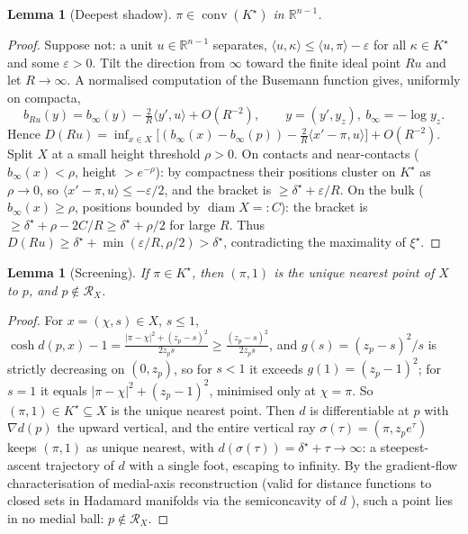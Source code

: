\documentclass[11pt]{article}
\newtheorem{lemma}[theorem]{Lemma}
\theoremstyle{remark}
\newcommand{\R}{\mathbb{R}}
\newcommand{\X}{X}
\newcommand{\Rx}{\mathcal{R}_{\X}}
\begin{document}
\begin{lemma}[Deepest shadow]\label{lem:deepshadow}
$\pi\in\operatorname{conv}(K^{\star})$ in $\R^{n-1}$.
\end{lemma}

\begin{proof}
Suppose not: a unit $u\in\R^{n-1}$ separates,
$\langle u,\kappa\rangle\le\langle u,\pi\rangle-\varepsilon$ for all
$\kappa\in K^{\star}$ and some $\varepsilon>0$. Tilt the direction
from $\infty$ toward the finite ideal point $Ru$ and let $R\to\infty$.
A normalised computation of the Busemann function gives, uniformly on
compacta,
\[
b_{Ru}(y)=b_{\infty}(y)-\tfrac{2}{R}\langle y',u\rangle+O(R^{-2}),
\qquad y=(y',y_{z}),\ b_{\infty}=-\log y_{z}.
\]
Hence $D(Ru)=\inf_{x\in\X}\bigl[(b_{\infty}(x)-b_{\infty}(p))-
\tfrac{2}{R}\langle x'-\pi,u\rangle\bigr]+O(R^{-2})$. Split $\X$ at a
small height threshold $\rho>0$. On contacts and near-contacts
($b_{\infty}(x)<\rho$, height $>e^{-\rho}$): by compactness their
positions cluster on $K^{\star}$ as $\rho\to0$, so
$\langle x'-\pi,u\rangle\le-\varepsilon/2$, and the bracket is
$\ge\delta^{\star}+\varepsilon/R$. On the bulk ($b_{\infty}(x)\ge\rho$,
positions bounded by $\operatorname{diam}\X=:C$): the bracket is
$\ge\delta^{\star}+\rho-2C/R\ge\delta^{\star}+\rho/2$ for large $R$.
Thus $D(Ru)\ge\delta^{\star}+\min(\varepsilon/R,\rho/2)>\delta^{\star}$,
contradicting the maximality of $\xi^{\star}$.
\end{proof}

\begin{lemma}[Screening]\label{lem:screening}
If $\pi\in K^{\star}$, then $(\pi,1)$ is the unique nearest point of
$\X$ to $p$, and $p\notin\Rx$.
\end{lemma}

\begin{proof}
For $x=(\chi,s)\in\X$, $s\le1$,
$\cosh d(p,x)-1=\frac{\lvert\pi-\chi\rvert^{2}+(z_{p}-s)^{2}}{2z_{p}s}
\ge\frac{(z_{p}-s)^{2}}{2z_{p}s}$, and $g(s)=(z_{p}-s)^{2}/s$ is
strictly decreasing on $(0,z_{p})$, so for $s<1$ it exceeds
$g(1)=(z_{p}-1)^{2}$; for $s=1$ it equals $\lvert\pi-\chi\rvert^{2}+
(z_{p}-1)^{2}$, minimised only at $\chi=\pi$. So $(\pi,1)\in K^{\star}
\subseteq\X$ is the unique nearest point. Then $d$ is differentiable
at $p$ with $\nabla d(p)$ the upward vertical, and the entire vertical
ray $\sigma(\tau)=(\pi,z_{p}e^{\tau})$ keeps $(\pi,1)$ as unique
nearest, with $d(\sigma(\tau))=\delta^{\star}+\tau\to\infty$: a
steepest-ascent trajectory of $d$ with a single foot, escaping to
infinity. By the gradient-flow characterisation of medial-axis
reconstruction \cite{Lie} (valid for distance functions to closed sets
in Hadamard manifolds via the semiconcavity of $d$ \cite{ACa}), such a
point lies in no medial ball: $p\notin\Rx$.
\end{proof}
\end{document}

